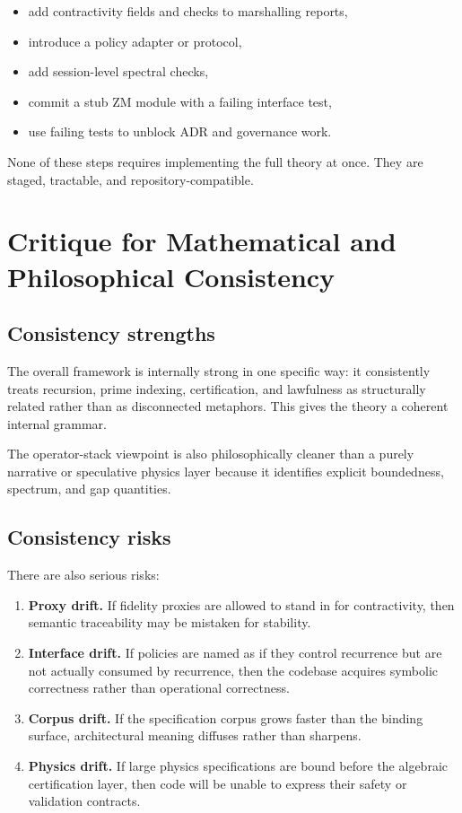 \documentclass[11pt]{article}
\begin{document}
\begin{itemize}
\item add contractivity fields and checks to marshalling reports,
\item introduce a policy adapter or protocol,
\item add session-level spectral checks,
\item commit a stub ZM module with a failing interface test,
\item use failing tests to unblock ADR and governance work.
\end{itemize}

None of these steps requires implementing the full theory at once. They are staged, tractable, and repository-compatible.

\section{Critique for Mathematical and Philosophical Consistency}

\subsection{Consistency strengths}

The overall framework is internally strong in one specific way: it consistently treats recursion, prime indexing, certification, and lawfulness as structurally related rather than as disconnected metaphors. This gives the theory a coherent internal grammar.

The operator-stack viewpoint is also philosophically cleaner than a purely narrative or speculative physics layer because it identifies explicit boundedness, spectrum, and gap quantities.

\subsection{Consistency risks}

There are also serious risks:

\begin{enumerate}[label=\arabic*.]
\item \textbf{Proxy drift.} If fidelity proxies are allowed to stand in for contractivity, then semantic traceability may be mistaken for stability.
\item \textbf{Interface drift.} If policies are named as if they control recurrence but are not actually consumed by recurrence, then the codebase acquires symbolic correctness rather than operational correctness.
\item \textbf{Corpus drift.} If the specification corpus grows faster than the binding surface, architectural meaning diffuses rather than sharpens.
\item \textbf{Physics drift.} If large physics specifications are bound before the algebraic certification layer, then code will be unable to express their safety or validation contracts.
\end{enumerate}
\end{document}
